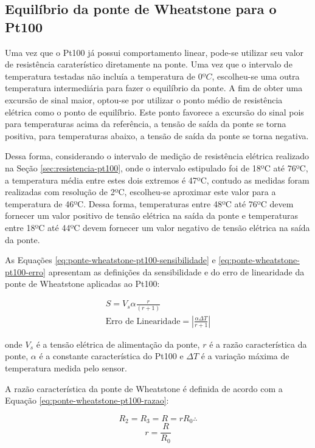 \documentclass[a4paper]{instrumentacao}
\begin{document}
\subsection{Equilíbrio da ponte de Wheatstone para o Pt100}
Uma vez que o Pt100 já possui comportamento linear, pode-se utilizar seu valor de resistência caraterístico diretamente na ponte. Uma vez que o intervalo de temperatura testadas não incluía a temperatura de $0ºC$, escolheu-se uma outra temperatura intermediária para fazer o equilíbrio da ponte. A fim de obter uma excursão de sinal maior, optou-se por utilizar o ponto médio de resistência elétrica como o ponto de equilíbrio. Este ponto favorece a excursão do sinal pois para temperaturas acima da referência, a tensão de saída da ponte se torna positiva, para temperaturas abaixo, a tensão de saída da ponte se torna negativa.

Dessa forma, considerando o intervalo de medição de resistência elétrica realizado na Seção \ref{sec:resistencia-pt100}, onde o intervalo estipulado foi de 18ºC até 76ºC, a temperatura média entre estes dois extremos é 47ºC, contudo as medidas foram realizadas com resolução de 2ºC, escolheu-se aproximar este valor para a temperatura de 46ºC. Dessa forma, temperaturas entre 48ºC até 76ºC devem fornecer um valor positivo de tensão elétrica na saída da ponte e temperaturas entre 18ºC até 44ºC devem fornecer um valor negativo de tensão elétrica na saída da ponte.

As Equações \ref{eq:ponte-wheatstone-pt100-sensibilidade} e \ref{eq:ponte-wheatstone-pt100-erro} apresentam as definições da sensibilidade e do erro de linearidade da ponte de Wheatstone aplicadas ao Pt100:


\begin{eqnarray}
	S = V_s \alpha \frac{r}{(r+1)}	 \label{eq:ponte-wheatstone-pt100-sensibilidade} \\
	\text{Erro de Linearidade} = \left|\frac{\alpha \Delta T}{r+1}\right|			   \label{eq:ponte-wheatstone-pt100-erro}
\end{eqnarray}

\noindent onde $V_s$ é a tensão elétrica de alimentação da ponte, $r$ é a razão característica da ponte, $\alpha$ é a constante característica do Pt100 e $\Delta T$ é a variação máxima de temperatura medida pelo sensor.

A razão característica da ponte de Wheatstone é definida de acordo com a Equação \ref{eq:ponte-wheatstone-pt100-razao}:

\begin{equation*}
	R_2 = R_3 = R = r R_0 \therefore
\end{equation*}
\begin{equation}
	r = \frac{R}{R_0}
	\label{eq:ponte-wheatstone-pt100-razao}
\end{equation}
\end{document}
